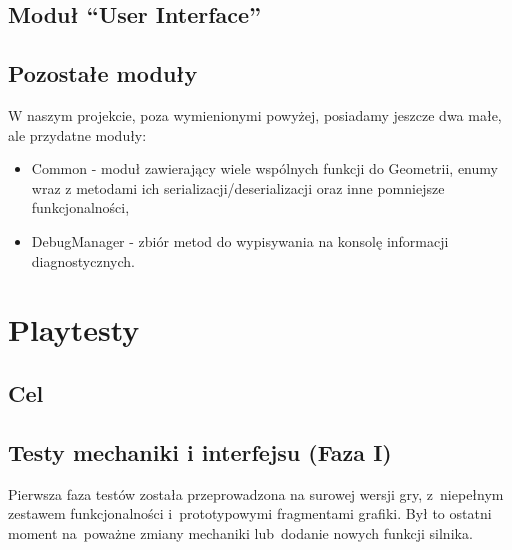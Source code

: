 \documentclass[licencjacka]{pracamgr}
\begin{document}
  \section{Moduł ``User Interface''}

  \section{Pozostałe moduły}
    W naszym projekcie, poza wymienionymi powyżej, posiadamy jeszcze dwa małe, ale przydatne moduły:
    \begin{itemize}
     \item Common - moduł zawierający wiele wspólnych funkcji do Geometrii, enumy wraz z metodami ich
     serializacji/deserializacji oraz inne pomniejsze funkcjonalności,
     \item DebugManager - zbiór metod do wypisywania na konsolę informacji diagnostycznych.
    \end{itemize}


\chapter{Playtesty}
  \section{Cel}

    \section{Testy mechaniki i interfejsu (Faza I)}
    Pierwsza faza testów została przeprowadzona na surowej wersji gry,
    z~niepełnym zestawem funkcjonalności i~prototypowymi fragmentami grafiki.
    Był to ostatni moment na~poważne zmiany mechaniki lub~dodanie nowych funkcji silnika.
\end{document}
